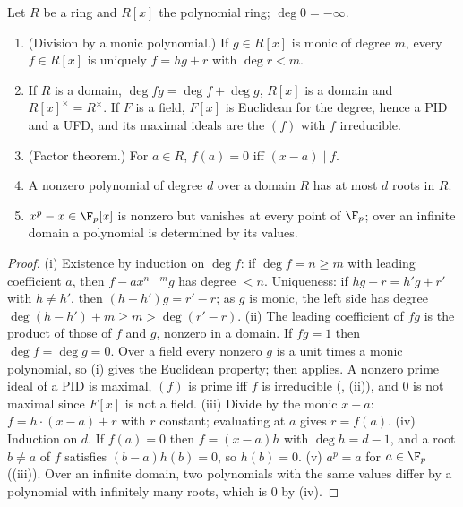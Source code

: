 \begin{proposition}\label{prop:rings:poly-division}
Let $R$ be a ring and $R[x]$ the polynomial ring; $\deg0=-\infty$.
\begin{enumerate}[label=(\roman*)]
\item (Division by a monic polynomial.) If $g\in R[x]$ is monic of degree $m$, every $f\in R[x]$ is uniquely $f=hg+r$ with $\deg r<m$.
\item If $R$ is a domain, $\deg fg=\deg f+\deg g$, $R[x]$ is a domain and $R[x]^\times=R^\times$. If $F$ is a field, $F[x]$ is Euclidean for the
degree, hence a PID and a UFD, and its maximal ideals are the $(f)$ with $f$ irreducible.
\item (Factor theorem.) For $a\in R$, $f(a)=0$ iff $(x-a)\mid f$.
\item A nonzero polynomial of degree $d$ over a domain $R$ has at most $d$ roots in $R$.
\item $x^p-x\in\F_p[x]$ is nonzero but vanishes at every point of $\F_p$; over an infinite domain a polynomial is determined by
its values.
\end{enumerate}
\end{proposition}

\begin{proof}
(i) Existence by induction on $\deg f$: if $\deg f=n\ge m$ with leading coefficient $a$, then $f-ax^{n-m}g$ has degree $<n$. Uniqueness: if
$hg+r=h'g+r'$ with $h\ne h'$, then $(h-h')g=r'-r$; as $g$ is monic, the left side has degree $\deg(h-h')+m\ge m>\deg(r'-r)$.
(ii) The leading coefficient of $fg$ is the product of those of $f$ and $g$, nonzero in a domain. If $fg=1$ then $\deg f=\deg g=0$.
Over a field every nonzero $g$ is a unit times a monic polynomial, so (i) gives the Euclidean property; then
 applies. A nonzero prime ideal of a PID is maximal, $(f)$ is prime iff $f$ is irreducible
(, (ii)), and $0$ is not maximal since $F[x]$ is not a field.
(iii) Divide by the monic $x-a$: $f=h\cdot(x-a)+r$ with $r$ constant; evaluating at $a$ gives $r=f(a)$.
(iv) Induction on $d$. If $f(a)=0$ then $f=(x-a)h$ with $\deg h=d-1$, and a root $b\ne a$ of $f$ satisfies $(b-a)h(b)=0$, so $h(b)=0$.
(v) $a^p=a$ for $a\in\F_p$ ((iii)). Over an infinite domain, two polynomials with the same values differ
by a polynomial with infinitely many roots, which is $0$ by (iv).
\end{proof}

